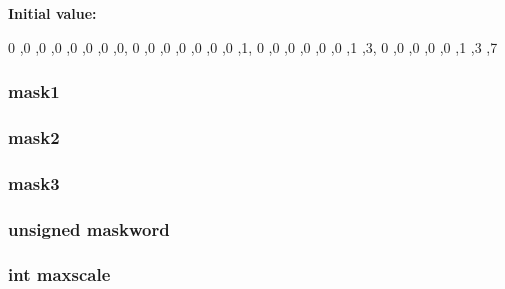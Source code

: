 \label{WL__SCALE_8C_ab39851371b2e506e131e50d79d8550d8}
{\bfseries Initial value:}
\begin{DoxyCode}
 {
{0 ,0 ,0 ,0 ,0 ,0 ,0 ,0},
{0 ,0 ,0 ,0 ,0 ,0 ,0 ,1},
{0 ,0 ,0 ,0 ,0 ,0 ,1 ,3},
{0 ,0 ,0 ,0 ,0 ,1 ,3 ,7} }
\end{DoxyCode}
\hypertarget{WL__SCALE_8C_a522ae19258cf30475ed90bb76819efb1}{
\subsubsection[{mask1}]{ {\bf mask1}}}
\label{WL__SCALE_8C_a522ae19258cf30475ed90bb76819efb1}
\hypertarget{WL__SCALE_8C_adadec9ebf5f6fe80150d567aa14fb9df}{
\subsubsection[{mask2}]{ {\bf mask2}}}
\label{WL__SCALE_8C_adadec9ebf5f6fe80150d567aa14fb9df}
\hypertarget{WL__SCALE_8C_a2cf11bafb2cecc45d9388a79b54483b7}{
\subsubsection[{mask3}]{ {\bf mask3}}}
\label{WL__SCALE_8C_a2cf11bafb2cecc45d9388a79b54483b7}
\hypertarget{WL__SCALE_8C_a6ccb606fa584e073646279771b40a0ee}{
\subsubsection[{maskword}]{\setlength{\rightskip}{0pt plus 5cm}unsigned {\bf maskword}}}
\label{WL__SCALE_8C_a6ccb606fa584e073646279771b40a0ee}
\hypertarget{WL__SCALE_8C_a4531e3adda9a00231c5fc8b7a4644398}{
\subsubsection[{maxscale}]{\setlength{\rightskip}{0pt plus 5cm}int {\bf maxscale}}}
\label{WL__SCALE_8C_a4531e3adda9a00231c5fc8b7a4644398}
